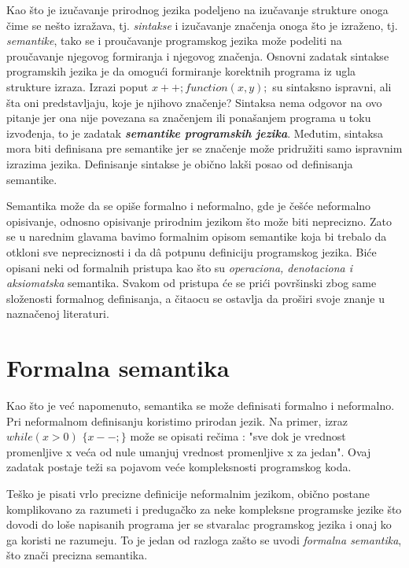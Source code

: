 \documentclass[a4paper]{article}
\begin{document}
{ Kao što je izučavanje prirodnog jezika podeljeno  na izučavanje strukture onoga čime se nešto izražava, tj. \textit{sintakse} i izučavanje značenja onoga što je izraženo, tj. \textit{semantike}, tako se i proučavanje programskog jezika može podeliti na proučavanje njegovog formiranja i njegovog značenja. Osnovni zadatak sintakse programskih jezika je da omogući formiranje korektnih programa iz ugla strukture izraza. Izrazi poput $ x++; function(x,y); $ su sintaksno ispravni, ali šta oni predstavljaju, koje je njihovo značenje? Sintaksa nema odgovor na ovo pitanje jer ona nije povezana sa značenjem ili ponašanjem programa u toku izvođenja, to je zadatak \textit{\textbf{semantike programskih jezika}}. Međutim, sintaksa mora biti definisana pre semantike jer se značenje može pridružiti samo ispravnim izrazima jezika. Definisanje sintakse je obično lakši posao od definisanja semantike.

	Semantika može da se opiše formalno i neformalno, gde je češće neformalno opisivanje, odnosno opisivanje prirodnim jezikom što može biti neprecizno. Zato se u narednim glavama bavimo formalnim opisom semantike koja bi trebalo da otkloni sve nepreciznosti i da d\^a potpunu definiciju programskog jezika. Biće opisani neki od formalnih pristupa kao što su \textit{operaciona, denotaciona i aksiomatska} semantika. Svakom od pristupa će se prići površinski zbog same složenosti formalnog definisanja, a čitaocu se ostavlja da proširi svoje znanje u naznačenoj literaturi.



\section{Formalna semantika}
\label{sec:forsem}

\qquad Kao što je već napomenuto, semantika se može definisati formalno i neformalno. Pri neformalnom definisanju koristimo prirodan jezik. Na primer, izraz $ while(x > 0)$  $\lbrace x--;\rbrace$ može se opisati rečima : "sve dok je vrednost promenljive x veća od nule umanjuj vrednost promenljive x za jedan". Ovaj zadatak postaje teži sa pojavom veće kompleksnosti programskog koda.

Teško je pisati vrlo precizne definicije neformalnim jezikom, obično postane komplikovano za razumeti i predugačko za neke kompleksne programske jezike što dovodi do loše napisanih programa jer se stvaralac programskog jezika i onaj ko ga koristi ne razumeju. To je jedan od razloga zašto se uvodi \textit{formalna semantika}, što znači precizna semantika.

}
\end{document}
